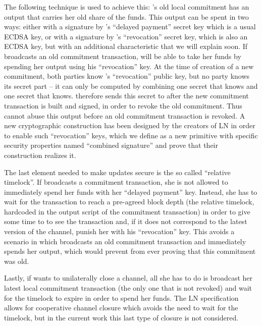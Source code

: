     The following technique is used to achieve this: \alice's old local
    commitment has an output that carries her old share of the funds. This
    output can be spent in two ways: either with a signature by \alice's
    ``delayed payment'' secret key which is a usual ECDSA key, or with a
    signature by \bob's ``revocation'' secret key, which is also an ECDSA key,
    but with an additional characteristic that we will explain soon. If \alice{}
    broadcasts an old commitment transaction, \bob{} will be able to take her
    funds by spending her output using his ``revocation'' key.  At the time of
    creation of a new commitment, both parties know \bob's ``revocation'' public
    key, but no party knows its secret part -- it can only be computed by
    combining one secret that \alice{} knows and one secret that \bob{} knows.
    \alice{} therefore sends this secret to \bob{} after the new commitment
    transaction is built and signed, in order to revoke the old commitment. Thus
    \bob{} cannot abuse this output before an old commitment transaction is
    revoked. A new cryptographic construction has been designed by the creators
    of LN in order to enable such ``revocation'' keys, which we define as a new
    primitive with specific security properties named ``combined signature'' and
    prove that their construction realizes it.

    The last element needed to make updates secure is the so called ``relative
    timelock''. If \alice{} broadcasts a commitment transaction, she is not
    allowed to immediately spend her funds with her ``delayed payment'' key.
    Instead, she has to wait for the transaction to reach a pre-agreed block
    depth (the relative timelock, hardcoded in the output script of the
    commitment transaction) in order to give some time to \bob{} to see the
    transaction and, if it does not correspond to the latest version of the
    channel, punish her with his ``revocation'' key. This avoids a scenario in
    which \alice{} broadcasts an old commitment transaction and immediately
    spends her output, which would prevent \bob{} from ever proving that this
    commitment was old.

    Lastly, if \alice{} wants to unilaterally close a channel, all she has to do
    is broadcast her latest local commitment transaction (the only one that is
    not revoked) and wait for the timelock to expire in order to spend her
    funds. The LN specification allows for cooperative channel closure which
    avoids the need to wait for the timelock, but in the current work
    this last type of closure is not considered.
